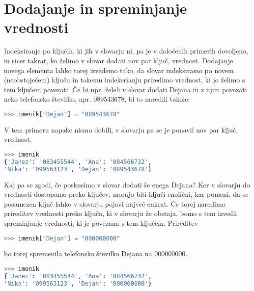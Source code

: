 \section{Dodajanje in spreminjanje vrednosti}

Indeksiranje po ključih, ki jih v slovarju ni, pa je v določenih primerih dovoljeno, in sicer takrat, ko želimo v slovar dodati nov par ključ, vrednost. Dodajanje novega elementa lahko torej izvedemo tako, da slovar indeksiramo po novem (neobstoječem) ključu in takemu indeksrianju priredimo vrednost, ki jo želimo s tem ključem povezati. Če bi npr. želeli v slovar dodati Dejana in z njim povezati neko telefonsko številko, npr. 089543678, bi to naredili takole:
\begin{lstlisting}[language=Python, showstringspaces=false]
>>> imenik["Dejan"] = "089543678"
\end{lstlisting}
V tem primeru napake nismo dobili, v slovarju pa se je ponavil nov par ključ, vrednost.
\begin{lstlisting}[language=Python, showstringspaces=false]
>>> imenik
{'Janez': '083455544', 'Ana': '084566732', 
'Nika': '099563123', 'Dejan': '089543678'}
\end{lstlisting}

Kaj pa se zgodi, če poskusimo v slovar dodati še enega Dejana? Ker v slovarju do vrednosti dostopamo preko ključev, morajo biti ključi enolični, kar pomeni, da se posamezen ključ lahko v slovarju pojavi največ enkrat. Če torej naredimo prireditev vrednosti preko ključa, ki v slovarju že obstaja, bomo s tem izvedli spreminjanje vrednosti, ki je povezana s tem ključem. Prireditev
\begin{lstlisting}[language=Python, showstringspaces=false]
>>> imenik["Dejan"] = "000000000"
\end{lstlisting}
bo torej spremenila telefonsko številko Dejana na 000000000.
\begin{lstlisting}[language=Python, showstringspaces=false]
>>> imenik
{'Janez': '083455544', 'Ana': '084566732', 
'Nika': '099563123', 'Dejan': '000000000'}
\end{lstlisting}

